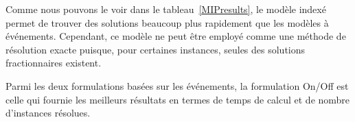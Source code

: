 Comme nous pouvons le voir dans le tableau~\ref{MIPresults}, le
modèle indexé permet de trouver des solutions beaucoup plus rapidement
que les modèles à événements. Cependant, ce modèle ne peut être
employé comme une méthode de résolution exacte  puisque, pour
certaines instances, seules des solutions fractionnaires existent. 

Parmi les deux formulations basées sur les événements, la formulation
On/Off est celle qui fournie les meilleurs résultats en termes de
temps de calcul et de nombre d'instances résolues. 
